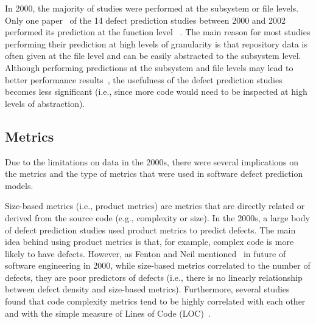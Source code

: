 
In 2000, the majority of studies were performed at the subsystem or file levels. Only one paper~\cite{Wong2000SPE} of the 14 defect prediction studies between 2000 and 2002 performed its prediction at the function level ~\cite{Shihab2012PhD}. The main reason for most studies performing their prediction at high levels of granularity is that repository data is often given at the file level and can be easily abstracted to the subsystem level. Although performing predictions at the subsystem and file levels may lead to better performance results~\cite{Schroter2006ISESE,Zimmermann2007}, the usefulness of the defect prediction studies becomes less significant (i.e., since more code would need to be inspected at high levels of abstraction).



\subsection{Metrics}
Due to the limitations on data in the 2000s, there were several implications on the metrics and the type of metrics that were used in software defect prediction models.

Size-based metrics (i.e., product metrics) are metrics that are directly related or derived from the source code (e.g., complexity or size). In the 2000s, a large body of defect prediction studies used product metrics to predict defects. The main idea behind using product metrics is that, for example, complex code is more likely to have defects. However, as Fenton and Neil mentioned~\cite{Fenton2000ICSE} in future of software engineering in 2000, while size-based metrics correlated to the number of defects, they are poor predictors of defects (i.e., there is no linearly relationship between defect density and size-based metrics). Furthermore, several studies found that code complexity metrics tend to be highly correlated with each other and with the simple measure of Lines of Code (LOC)~\cite{Fenton2000ICSE}.

